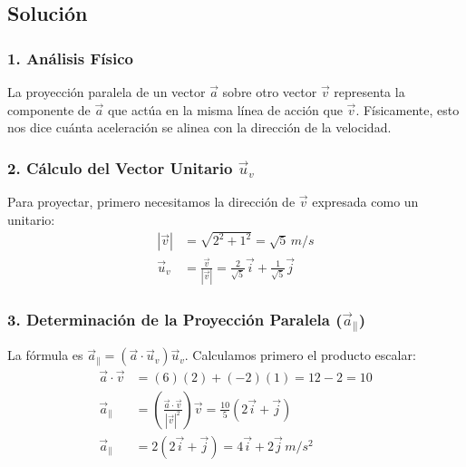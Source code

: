 \documentclass[12pt, a4paper]{article}
\begin{document}
\subsection*{Solución}

\subsubsection*{1. Análisis Físico}
La proyección paralela de un vector $\vec{a}$ sobre otro vector $\vec{v}$ representa la componente de $\vec{a}$ que actúa en la misma línea de acción que $\vec{v}$. Físicamente, esto nos dice cuánta aceleración se alinea con la dirección de la velocidad.

\subsubsection*{2. Cálculo del Vector Unitario $\vec{u}_v$}
Para proyectar, primero necesitamos la dirección de $\vec{v}$ expresada como un unitario:
\begin{align*}
    |\vec{v}| &= \sqrt{2^2 + 1^2} = \sqrt{5} \, \si{m/s} \\
    \vec{u}_v &= \frac{\vec{v}}{|\vec{v}|} = \frac{2}{\sqrt{5}}\vec{i} + \frac{1}{\sqrt{5}}\vec{j}
\end{align*}

\subsubsection*{3. Determinación de la Proyección Paralela ($\vec{a}_{\|}$)}
La fórmula es $\vec{a}_{\|} = (\vec{a} \cdot \vec{u}_v) \vec{u}_v$. Calculamos primero el producto escalar:
\begin{align*}
    \vec{a} \cdot \vec{v} &= (6)(2) + (-2)(1) = 12 - 2 = 10 \\
    \vec{a}_{\|} &= \left( \frac{\vec{a} \cdot \vec{v}}{|\vec{v}|^2} \right) \vec{v} = \frac{10}{5} (2\vec{i} + \vec{j}) \\
    \vec{a}_{\|} &= 2(2\vec{i} + \vec{j}) = 4\vec{i} + 2\vec{j} \, \si{m/s^2}
\end{align*}
\end{document}
